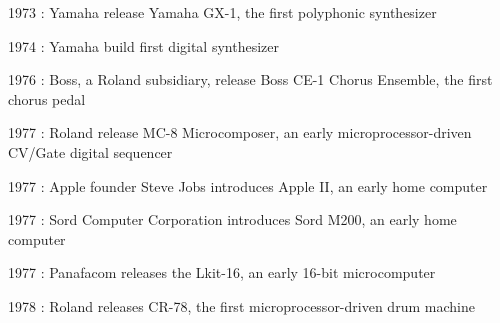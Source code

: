 \documentclass[12pt]{report}
\begin{document}
\begin{adjustwidth}{0.5in}{0.0in}
1973 : Yamaha release Yamaha GX-1, the first polyphonic synthesizer\par

\end{adjustwidth}

\begin{adjustwidth}{0.5in}{0.0in}
1974 : Yamaha build first digital synthesizer\par

\end{adjustwidth}

\begin{adjustwidth}{0.5in}{0.0in}
1976 : Boss, a Roland subsidiary, release Boss CE-1 Chorus Ensemble, the first chorus pedal\par

\end{adjustwidth}

\begin{adjustwidth}{0.5in}{0.0in}
1977 : Roland release MC-8 Microcomposer, an early microprocessor-driven CV/Gate digital sequencer\par

\end{adjustwidth}

\begin{adjustwidth}{0.5in}{0.0in}
1977 : Apple founder Steve Jobs introduces Apple II, an early home computer\par

\end{adjustwidth}

\begin{adjustwidth}{0.5in}{0.0in}
1977 : Sord Computer Corporation introduces Sord M200, an early home computer\par

\end{adjustwidth}

\begin{adjustwidth}{0.5in}{0.0in}
1977 : Panafacom releases the Lkit-16, an early 16-bit microcomputer\par

\end{adjustwidth}

\begin{adjustwidth}{0.5in}{0.0in}
1978 : Roland releases CR-78, the first microprocessor-driven drum machine\par

\end{adjustwidth}
\end{document}

